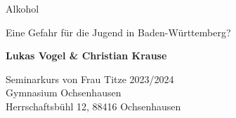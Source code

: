 
\begin{titlepage}
    \begin{center}
        \vspace*{1cm}
 
        {\huge{Alkohol}}
 
        \vspace{0.7cm}
         {\Large Eine Gefahr für die Jugend in Baden-Württemberg?}
             
        \vspace{1cm}
 
        \textbf{Lukas Vogel \& Christian Krause}
              
             
        \vfill
        \large
        Seminarkurs von Frau Titze 2023/2024\\
        Gymnasium Ochsenhausen\\
        Herrschaftsbühl 12, 88416 Ochsenhausen
             
    \end{center}
 \end{titlepage}